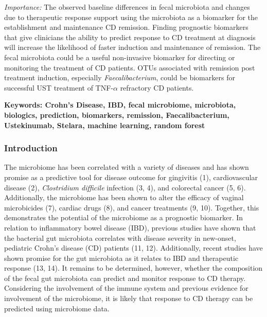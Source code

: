 \documentclass[12pt,]{article}
\begin{document}
\emph{Importance:} The observed baseline differences in fecal microbiota
and changes due to therapeutic response support using the microbiota as
a biomarker for the establishment and maintenance CD remission. Finding
prognostic biomarkers that give clinicians the ability to predict
response to CD treatment at diagnosis will increase the likelihood of
faster induction and maintenance of remission. The fecal microbiota
could be a useful non-invasive biomarker for directing or monitoring the
treatment of CD patients. OTUs associated with remission post treatment
induction, especially \emph{Faecalibacterium}, could be biomarkers for
successful UST treatment of TNF-\({\alpha}\) refractory CD patients.

\textbf{Keywords: Crohn's Disease, IBD, fecal microbiome, microbiota,
biologics, prediction, biomarkers, remission, Faecalibacterium,
Ustekinumab, Stelara, machine learning, random forest}

\newpage

\subsubsection{Introduction}\label{introduction}

The microbiome has been correlated with a variety of diseases and has
shown promise as a predictive tool for disease outcome for gingivitis
(1), cardiovascular disease (2), \emph{Clostridium difficile} infection
(3, 4), and colorectal cancer (5, 6). Additionally, the microbiome has
been shown to alter the efficacy of vaginal microbicides (7), cardiac
drugs (8), and cancer treatments (9, 10). Together, this demonstrates
the potential of the microbiome as a prognostic biomarker. In relation
to inflammatory bowel disease (IBD), previous studies have shown that
the bacterial gut microbiota correlates with disease severity in
new-onset, pediatric Crohn's disease (CD) patients (11, 12).
Additionally, recent studies have shown promise for the gut microbiota
as it relates to IBD and therapeutic response (13, 14). It remains to be
determined, however, whether the composition of the fecal gut microbiota
can predict and monitor response to CD therapy. Considering the
involvement of the immune system and previous evidence for involvement
of the microbiome, it is likely that response to CD therapy can be
predicted using microbiome data.
\end{document}

